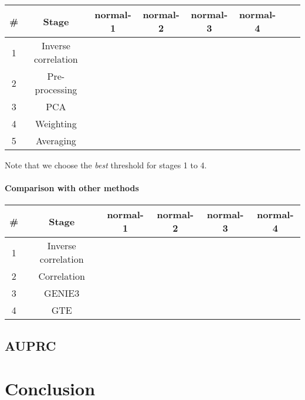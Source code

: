 \documentclass[wcp]{jmlr}
\begin{document}
\begin{table}[htb]
\centering
\begin{tabular}{|c|c||c|c|c|c|c|c|} \hline
\# & Stage & normal-1 & normal-2 & normal-3 & normal-4 \\ \hline
1 & Inverse correlation & & & & \\ \hline
2 & Pre-processing & & & &\\ \hline
3 & PCA & & & &  \\ \hline
4 & Weighting & & & &  \\ \hline
5 & Averaging & & & &  \\ \hline

\end{tabular}
\end{table}

Note that we choose the \textit{best} threshold for stages 1 to 4.
\paragraph{Comparison with other methods\\}

\begin{table}[htb]
\centering
\begin{tabular}{|c|c||c|c|c|c|} \hline
\# & Stage & normal-1 & normal-2 & normal-3 & normal-4 \\ \hline
1 & Inverse correlation & & & &\\ \hline
2 & Correlation & & & &\\ \hline
3 & GENIE3 & & & & \\ \hline
4 & GTE & & & & \\ \hline

\end{tabular}
\end{table}
\subsection{AUPRC}

\section{Conclusion}



\end{document}
